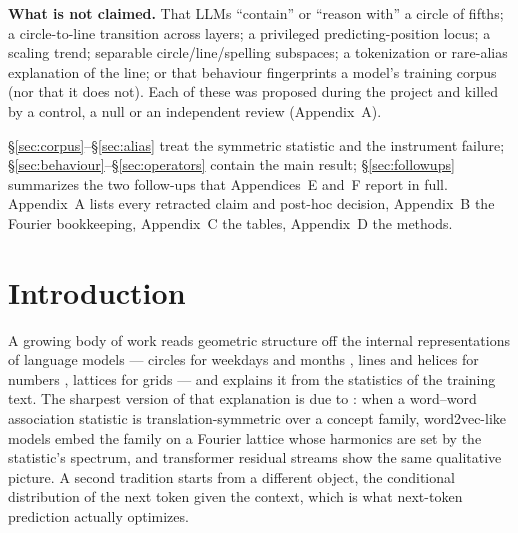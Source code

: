 \documentclass[11pt]{article}
\begin{document}
\begin{glancebox}
\smallskip\noindent\textbf{What is not claimed.} That LLMs ``contain'' or ``reason with'' a circle of fifths; a circle-to-line transition across layers; a privileged predicting-position locus; a scaling trend; separable circle/line/spelling subspaces; a tokenization or rare-alias explanation of the line; or that behaviour fingerprints a model's training corpus (nor that it does not). Each of these was proposed during the project and killed by a control, a null or an independent review (Appendix~A).
\end{glancebox}

\begin{roadmapbox}
\S\ref{sec:corpus}--\S\ref{sec:alias} treat the symmetric statistic and the instrument failure; \S\ref{sec:behaviour}--\S\ref{sec:operators} contain the main result; \S\ref{sec:followups} summarizes the two follow-ups that Appendices~E and~F report in full. Appendix~A lists every retracted claim and post-hoc decision, Appendix~B the Fourier bookkeeping, Appendix~C the tables, Appendix~D the methods.
\end{roadmapbox}

\section{Introduction}\label{sec:intro}

A growing body of work reads geometric structure off the internal representations of language models --- circles for weekdays and months \citep{engels2025not}, lines and helices for numbers \citep{gurnee2024space,bassi2026ordinal}, lattices for grids \citep{brenner2026grid} --- and explains it from the statistics of the training text. The sharpest version of that explanation is due to \citet{karkada2026symmetry}: when a word--word association statistic is translation-symmetric over a concept family, word2vec-like models embed the family on a Fourier lattice whose harmonics are set by the statistic's spectrum, and transformer residual streams show the same qualitative picture. A second tradition \citep{zhao2024implicit,zhao2025geometry} starts from a different object, the conditional distribution of the next token given the context, which is what next-token prediction actually optimizes.
\end{document}
